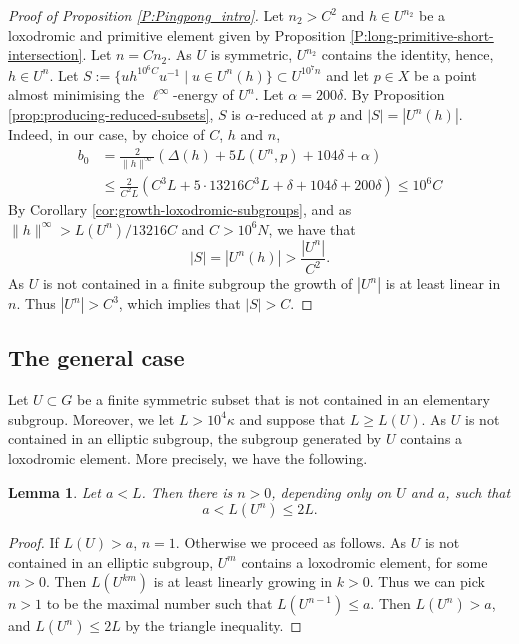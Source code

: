 \documentclass[leqno,a4paper,10pt]{amsart}
\theoremstyle{plain}
\newtheorem{lem}[thm]{Lemma}
\theoremstyle{definition}
\theoremstyle{remark}
\let\ge\geqslant
\begin{document}
\begin{proof}[Proof of Proposition \ref{P:Pingpong_intro}]
Let $n_2>C^2$ and $h\in U^{n_2}$ be a loxodromic and primitive element given by Proposition \ref{P:long-primitive-short-intersection}.
 Let $n=Cn_2$. As $U$ is symmetric, $U^{n_2}$ contains the identity, hence, $h\in U^n$. Let 
 $S:=\{uh^{10^6C}u^{-1}\mid u\in U^{n}(h)\}\subset U^{10^7n}$ and let $p\in X$ be a point almost minimising the $\ell^{\infty}$-energy of $U^n$.  
Let $\alpha=200\delta$. By Proposition \ref{prop:producing-reduced-subsets}, $S$ is $\alpha$-reduced at $p$ and $|S|=|U^n(h)|$. Indeed, in our case, by choice of $C$, $h$ and $n$, 
\begin{align*}
b_0 & =\frac{2}{\|h\|^{\infty}}(\Delta(h)+5L(U^n,p)+104\delta + \alpha)\\
& \leqslant \frac{2}{C^2L}(C^3L+5\cdot 13216 C^3L+\delta + 104\delta+200\delta)\leqslant  10^6 C
\end{align*} 
By Corollary \ref{cor:growth-loxodromic-subgroups}, and as $\|h\|^{\infty}>L(U^{n})/13216 C$ and $C>10^6N$, we have that 
$$|S|=|U^{n}(h)|>\frac{|U^{n}|}{C^2}.$$
 As $U$ is not contained in a finite subgroup the growth of $|U^n|$ is at least linear in $n$. Thus $|U^{n}|>C^3$, which implies that $|S|>C$. 
\end{proof}

\subsection{The general case}

 Let $U\subset G$ be a finite symmetric subset that is not contained in an elementary subgroup. Moreover, we let $L > 10^4\kappa$  and suppose that $L \ge L (U)$. 
 As $U$ is not contained in an elliptic subgroup, the subgroup generated by $U$ contains a loxodromic element. More precisely, we have the following. 

\begin{lem}\label{L:power-large-energy} Let $a<L$. Then there is $n>0$, depending only on $U$ and $a$, such that 
$$a< L(U^{n}) \leqslant 2L.$$
\end{lem}
\begin{proof} If $L(U)>a$, $n=1$. Otherwise we proceed as follows. As $U$ is not contained in an elliptic subgroup, $U^m$ contains a loxodromic element, for some $m>0$. Then $L (U^{km})$ is at least linearly growing in $k>0$. Thus we can pick $n>1$ to be the maximal number such that  $L(U^{n-1})\leqslant a$. Then $L(U^{n})>a$, and $L(U^{n}) \leqslant 2L$ by the triangle inequality. 
\end{proof}
\end{document}
